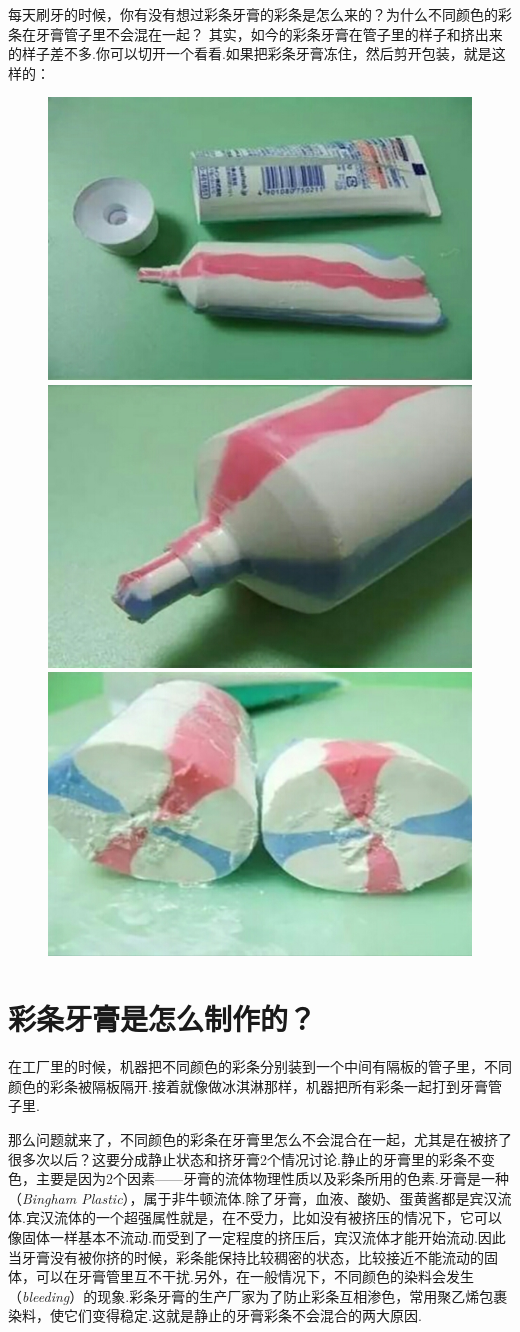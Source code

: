 \newpage
{}
\begin{multicols}{2}

每天刷牙的时候，你有没有想过彩条牙膏的彩条是怎么来的？为什么不同颜色的彩条在牙膏管子里不会混在一起？
其实，如今的彩条牙膏在管子里的样子和挤出来的样子差不多.你可以切开一个看看.如果把彩条牙膏冻住，然后剪开包装，就是这样的：
\begin{figure}[H]
    \centering
    \includegraphics[width=0.333\linewidth]{IMG/201907/03a.jpg}\includegraphics[width=0.333\linewidth]{IMG/201907/03b.jpg}\includegraphics[width=0.333\linewidth]{IMG/201907/03c.jpg}
    \caption{}
    
\end{figure}


\section*{彩条牙膏是怎么制作的？}

在工厂里的时候，机器把不同颜色的彩条分别装到一个中间有隔板的管子里，不同颜色的彩条被隔板隔开.接着就像做冰淇淋那样，机器把所有彩条一起打到牙膏管子里.


那么问题就来了，不同颜色的彩条在牙膏里怎么不会混合在一起，尤其是在被挤了很多次以后？这要分成静止状态和挤牙膏2个情况讨论.静止的牙膏里的彩条不变色，主要是因为2个因素——牙膏的流体物理性质以及彩条所用的色素.牙膏是一种（\textit{Bingham Plastic}\/），属于非牛顿流体.除了牙膏，血液、酸奶、蛋黄酱都是宾汉流体.宾汉流体的一个超强属性就是，在不受力，比如没有被挤压的情况下，它可以像固体一样基本不流动.而受到了一定程度的挤压后，宾汉流体才能开始流动.因此当牙膏没有被你挤的时候，彩条能保持比较稠密的状态，比较接近不能流动的固体，可以在牙膏管里互不干扰.另外，在一般情况下，不同颜色的染料会发生（\textit{bleeding}\/）的现象.彩条牙膏的生产厂家为了防止彩条互相渗色，常用聚乙烯包裹染料，使它们变得稳定.这就是静止的牙膏彩条不会混合的两大原因.
\end{multicols}

